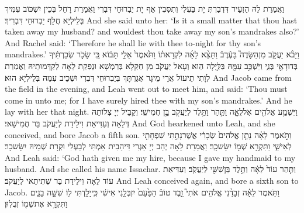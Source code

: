 {וַאֲמַרַת לַהּ הַזְעֵיר דִּדְבַרְתְּ יָת בַּעְלִי וְתִסְּבִין אַף יָת יַבְרוּחֵי דִּבְרִי וַאֲמַרַת רָחֵל בְּכֵין יִשְׁכּוֹב עִמִּיךְ בְּלֵילְיָא חֲלָף יַבְרוּחֵי דִּבְרִיךְ׃}
{And she said unto her: ‘Is it a small matter that thou hast taken away my husband? and wouldest thou take away my son’s mandrakes also?’ And Rachel said: ‘Therefore he shall lie with thee to-night for thy son’s mandrakes.’}{}
{וַיָּבֹ֨א יַעֲקֹ֣ב מִן\maqqaf הַשָּׂדֶה֮ בָּעֶ֒רֶב֒ וַתֵּצֵ֨א לֵאָ֜ה לִקְרָאת֗וֹ וַתֹּ֙אמֶר֙ אֵלַ֣י תָּב֔וֹא כִּ֚י שָׂכֹ֣ר שְׂכַרְתִּ֔יךָ בְּדוּדָאֵ֖י בְּנִ֑י וַיִּשְׁכַּ֥ב עִמָּ֖הּ בַּלַּ֥יְלָה הֽוּא׃}
{וְעָאל יַעֲקֹב מִן חַקְלָא בְּרַמְשָׁא וּנְפַקַת לֵאָה לְקַדָּמוּתֵיהּ וַאֲמַרַת לְוָתִי תֵיעוֹל אֲרֵי מֵיגָר אֲגַרְתָּךְ בְּיַבְרוּחֵי דִּבְרִי וּשְׁכֵיב עִמַּהּ בְּלֵילְיָא הוּא׃}
{And Jacob came from the field in the evening, and Leah went out to meet him, and said: ‘Thou must come in unto me; for I have surely hired thee with my son’s mandrakes.’ And he lay with her that night.}{}
{וַיִּשְׁמַ֥ע אֱלֹהִ֖ים אֶל\maqqaf לֵאָ֑ה וַתַּ֛הַר וַתֵּ֥לֶד לְיַעֲקֹ֖ב בֵּ֥ן חֲמִישִֽׁי׃}
{וְקַבֵּיל יְיָ צְלוֹתַהּ דְּלֵאָה וְעַדִּיאַת וִילֵידַת לְיַעֲקֹב בַּר חֲמִישָׁאי׃}
{And God hearkened unto Leah, and she conceived, and bore Jacob a fifth son.}{}
{וַתֹּ֣אמֶר לֵאָ֗ה נָתַ֤ן אֱלֹהִים֙ שְׂכָרִ֔י אֲשֶׁר\maqqaf נָתַ֥תִּי שִׁפְחָתִ֖י לְאִישִׁ֑י וַתִּקְרָ֥א שְׁמ֖וֹ יִשָּׂשכָֽר׃}
{וַאֲמַרַת לֵאָה יְהַב יְיָ אַגְרִי דִּיהַבִית אַמְתִּי לְבַעְלִי וּקְרָת שְׁמֵיהּ יִשָּׂשכָר׃}
{And Leah said: ‘God hath given me my hire, because I gave my handmaid to my husband. And she called his name Issachar.}{}
{וַתַּ֤הַר עוֹד֙ לֵאָ֔ה וַתֵּ֥לֶד בֵּן\maqqaf שִׁשִּׁ֖י לְיַעֲקֹֽב׃}
{וְעַדִּיאַת עוֹד לֵאָה וִילֵידַת בַּר שְׁתִיתַאי לְיַעֲקֹב׃}
{And Leah conceived again, and bore a sixth son to Jacob.}{}
{וַתֹּ֣אמֶר לֵאָ֗ה זְבָדַ֨נִי אֱלֹהִ֥ים \pasek  אֹתִי֮ זֵ֣בֶד טוֹב֒ הַפַּ֙עַם֙ יִזְבְּלֵ֣נִי אִישִׁ֔י כִּֽי\maqqaf יָלַ֥דְתִּי ל֖וֹ שִׁשָּׁ֣ה בָנִ֑ים וַתִּקְרָ֥א אֶת\maqqaf שְׁמ֖וֹ זְבֻלֽוּן׃}
